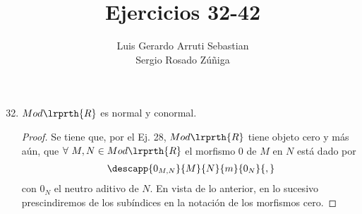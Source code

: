 \documentclass{article}
\title{Ejercicios 32-42}
\author{Luis Gerardo Arruti Sebastian\\ Sergio Rosado Zúñiga}
\date{}
\begin{document}
	\maketitle
	\begin{enumerate}[label=\textbf{Ej \arabic*.}]
		\setcounter{enumi}{31}
		\item $Mod\lrprth{R}$ es normal y conormal.
		\begin{proof}
			Se tiene que, por el Ej. 28, $Mod\lrprth{R}$ tiene objeto cero y más aún, que $\forall\ M,N\in Mod\lrprth{R}$ el morfismo $0$ de $M$ en $N$ está dado por
			\begin{align*}
				\descapp{0_{M,N}}{M}{N}{m}{0_N}{,}
			\end{align*} con $0_N$ el neutro aditivo de $N$. En vista de lo anterior, en lo sucesivo prescindiremos de los subíndices en la notación de los morfismos cero.
			

\end{proof}
\end{enumerate}
\end{document}
